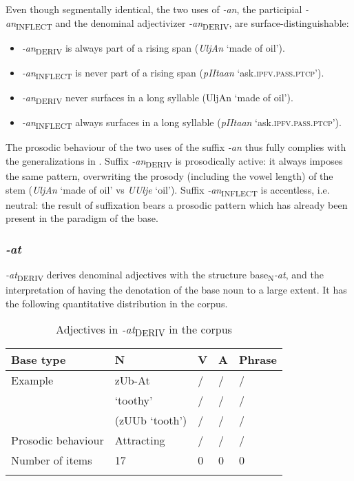\documentclass[output=paper]{langsci/langscibook}
\begin{document}
Even though segmentally identical, the two uses of \textit{-an}, the participial \textit{-an}\textsubscript{INFLECT} and the denominal adjectivizer \textit{-an}\textsubscript{DERIV}, are surface-distinguishable:
\begin{itemize}
  \item 
\textit{-an}\textsubscript{DERIV} is always part of a rising span (\textit{UljAn} `made of oil').
\item 
\textit{-an}\textsubscript{INFLECT} is never part of a rising span (\textit{pIItaan }`ask.\textsc{ipfv.pass.ptcp}').
\item \textit{-an}\textsubscript{DERIV} never surfaces in a long syllable ({UljAn} `made of oil'). 
\item  \textit{-an}\textsubscript{INFLECT} always surfaces in a long syllable (\textit{pIItaan }`ask.\textsc{ipfv.pass.ptcp}').
\end{itemize}

The prosodic behaviour of the two uses of the suffix \textit{-an} thus fully complies with the generalizations in . Suffix \textit{-an}\textsubscript{DERIV} is prosodically active: it always imposes the same pattern, overwriting the prosody (including the vowel length) of the stem (\textit{UljAn} `made of oil' vs \textit{UUlje} `oil'). Suffix \textit{-an}\textsubscript{INFLECT} is accentless, i.e. neutral: the result of suffixation bears a prosodic pattern which has already been present in the paradigm of the base. 

\subsubsection{\textit{-at}}\label{sec:simonovic:422}

\textit{-at}\textsubscript{DERIV} derives denominal adjectives with the structure base\textsubscript{N}\textit{-at}, and the interpretation of having the denotation of the base noun to a large extent. It has the following quantitative distribution in the corpus.

\begin{table}
\caption{Adjectives in \textit{-at}\textsubscript{DERIV} in the corpus}
\label{tab7}
 \begin{tabular}{ l l l l l}
\lsptoprule  
 Base type & N & V & A & Phrase\\ %
\midrule
Example  &  zUb-At & / & /  & /   \\
  & `toothy' & / & / & / \\
& (zUUb `tooth') & / & / & / \smallskip	\\ 
Prosodic behaviour & Attracting & / & / & /\smallskip \\
Number of items & 17 & 0 & 0 & 0 \\
 \lspbottomrule
 \end{tabular}
\end{table}
\end{document}

